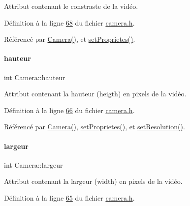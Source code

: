 Attribut contenant le constraste de la vidéo. 



Définition à la ligne \hyperlink{camera_8h_source_l00068}{68} du fichier \hyperlink{camera_8h_source}{camera.\+h}.



Référencé par \hyperlink{camera_8cpp_source_l00012}{Camera()}, et \hyperlink{camera_8cpp_source_l00108}{set\+Proprietes()}.

\mbox{\label{class_camera_a5d89d7f9d1a5eab4175dd168c7fbf1c7}} 
\paragraph{\texorpdfstring{hauteur}{hauteur}}
{\footnotesize\ttfamily int Camera\+::hauteur\hspace{0.3cm}{\ttfamily [private]}}



Attribut contenant la hauteur (heigth) en pixels de la vidéo. 



Définition à la ligne \hyperlink{camera_8h_source_l00066}{66} du fichier \hyperlink{camera_8h_source}{camera.\+h}.



Référencé par \hyperlink{camera_8cpp_source_l00012}{Camera()}, \hyperlink{camera_8cpp_source_l00108}{set\+Proprietes()}, et \hyperlink{camera_8cpp_source_l00186}{set\+Resolution()}.

\mbox{\label{class_camera_ad64f26cdfc5aa561208b273d430938cf}} 
\paragraph{\texorpdfstring{largeur}{largeur}}
{\footnotesize\ttfamily int Camera\+::largeur\hspace{0.3cm}{\ttfamily [private]}}



Attribut contenant la largeur (width) en pixels de la vidéo. 



Définition à la ligne \hyperlink{camera_8h_source_l00065}{65} du fichier \hyperlink{camera_8h_source}{camera.\+h}.



